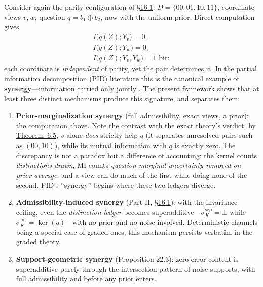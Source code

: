 
Consider again the parity configuration of \hyperlink{sec:16.1}{§16.1}: \(D = \{00,01,10,11\}\), coordinate views \(v, w\), question \(q = b_1 \oplus b_2\), now with the uniform prior. Direct computation gives
\[\begin{gathered}I\big(q(Z); Y_v\big) = 0, \\ I\big(q(Z); Y_w\big) = 0, \\ I\big(q(Z); Y_v, Y_w\big) = 1 \text{ bit}:\end{gathered}\]
each coordinate is \emph{independent} of parity, yet the pair determines it. In the partial information decomposition (PID) literature this is the canonical example of \textbf{synergy}---\hspace{0pt}information carried only jointly \autocite{williams2010}. The present framework shows that at least three distinct mechanisms produce this signature, and separates them:

\begin{enumerate}
\def\labelenumi{\arabic{enumi}.}
\item
  \textbf{Prior-marginalization synergy} (full admissibility, exact views, a prior): the computation above. Note the contrast with the exact theory's verdict: by \hyperlink{stmt:6.5}{Theorem~6.5}, \(v\) alone \emph{does} strictly help \(q\) (it separates unresolved pairs such as \((00, 10)\)), while its mutual information with \(q\) is exactly zero. The discrepancy is not a paradox but a difference of accounting: the kernel counts \emph{distinctions drawn}, MI counts \emph{question-marginal uncertainty removed on prior-average}, and a view can do much of the first while doing none of the second. PID's ``synergy'' begins where these two ledgers diverge.
\item
  \textbf{Admissibility-induced synergy} (Part II, \hyperlink{sec:16.1}{§16.1}): with the invariance ceiling, even the \emph{distinction ledger} becomes superadditive---\hspace{0pt}\(\sigma^{\mathrm{sep}}_K = \bot\) while \(\sigma^{\mathrm{jnt}}_K = \ker(q)\)---\hspace{0pt}with no prior and no noise involved. Deterministic channels being a special case of graded ones, this mechanism persists verbatim in the graded theory.
\item
  \textbf{Support-geometric synergy} (Proposition 22.3): zero-error content is superadditive purely through the intersection pattern of noise supports, with full admissibility and before any prior enters.
\end{enumerate}

